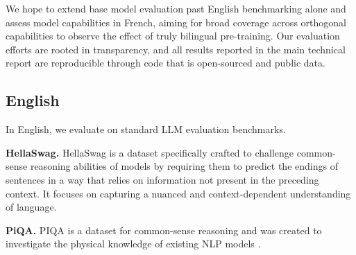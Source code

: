 
We hope to extend base model evaluation past English benchmarking alone and assess model capabilities in French, aiming for broad coverage across orthogonal capabilities to observe the effect of truly bilingual pre-training. Our evaluation efforts are rooted in transparency, and all results reported in the main technical report are reproducible through code that is open-sourced and public data.

\subsection{English}

In English, we evaluate on standard LLM evaluation benchmarks.


\textbf{HellaSwag.} HellaSwag  is a dataset specifically crafted to challenge common-sense reasoning abilities of models by requiring them to predict the endings of sentences in a way that relies on information not present in the preceding context. It focuses on capturing a nuanced and context-dependent understanding of language.

\textbf{PiQA.} PIQA is a dataset for common-sense reasoning and was created to investigate the physical knowledge of existing NLP models .


